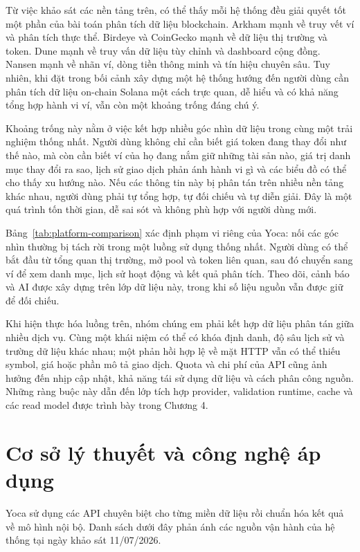 Từ việc khảo sát các nền tảng trên, có thể thấy mỗi hệ thống đều giải quyết tốt một phần của bài toán phân tích dữ liệu blockchain. Arkham mạnh về truy vết ví và phân tích thực thể. Birdeye và CoinGecko mạnh về dữ liệu thị trường và token. Dune mạnh về truy vấn dữ liệu tùy chỉnh và dashboard cộng đồng. Nansen mạnh về nhãn ví, dòng tiền thông minh và tín hiệu chuyên sâu. Tuy nhiên, khi đặt trong bối cảnh xây dựng một hệ thống hướng đến người dùng cần phân tích dữ liệu on-chain Solana một cách trực quan, dễ hiểu và có khả năng tổng hợp hành vi ví, vẫn còn một khoảng trống đáng chú ý.

Khoảng trống này nằm ở việc kết hợp nhiều góc nhìn dữ liệu trong cùng một trải nghiệm thống nhất. Người dùng không chỉ cần biết giá token đang thay đổi như thế nào, mà còn cần biết ví của họ đang nắm giữ những tài sản nào, giá trị danh mục thay đổi ra sao, lịch sử giao dịch phản ánh hành vi gì và các biểu đồ có thể cho thấy xu hướng nào. Nếu các thông tin này bị phân tán trên nhiều nền tảng khác nhau, người dùng phải tự tổng hợp, tự đối chiếu và tự diễn giải. Đây là một quá trình tốn thời gian, dễ sai sót và không phù hợp với người dùng mới.



Bảng~\ref{tab:platform-comparison} xác định phạm vi riêng của Yoca: nối các góc nhìn thường bị tách rời trong một luồng sử dụng thống nhất. Người dùng có thể bắt đầu từ tổng quan thị trường, mở pool và token liên quan, sau đó chuyển sang ví để xem danh mục, lịch sử hoạt động và kết quả phân tích. Theo dõi, cảnh báo và AI được xây dựng trên lớp dữ liệu này, trong khi số liệu nguồn vẫn được giữ để đối chiếu.

Khi hiện thực hóa luồng trên, nhóm chúng em phải kết hợp dữ liệu phân tán giữa nhiều dịch vụ. Cùng một khái niệm có thể có khóa định danh, độ sâu lịch sử và trường dữ liệu khác nhau; một phản hồi hợp lệ về mặt HTTP vẫn có thể thiếu symbol, giá hoặc phần mô tả giao dịch. Quota và chi phí của API cũng ảnh hưởng đến nhịp cập nhật, khả năng tái sử dụng dữ liệu và cách phân công nguồn. Những ràng buộc này dẫn đến lớp tích hợp provider, validation runtime, cache và các read model được trình bày trong Chương 4.

\section{Cơ sở lý thuyết và công nghệ áp dụng}
\label{sec:cong_nghe_ap_dung}

Yoca sử dụng các API chuyên biệt cho từng miền dữ liệu rồi chuẩn hóa kết quả về mô hình nội bộ. Danh sách dưới đây phản ánh các nguồn vận hành của hệ thống tại ngày khảo sát 11/07/2026.

